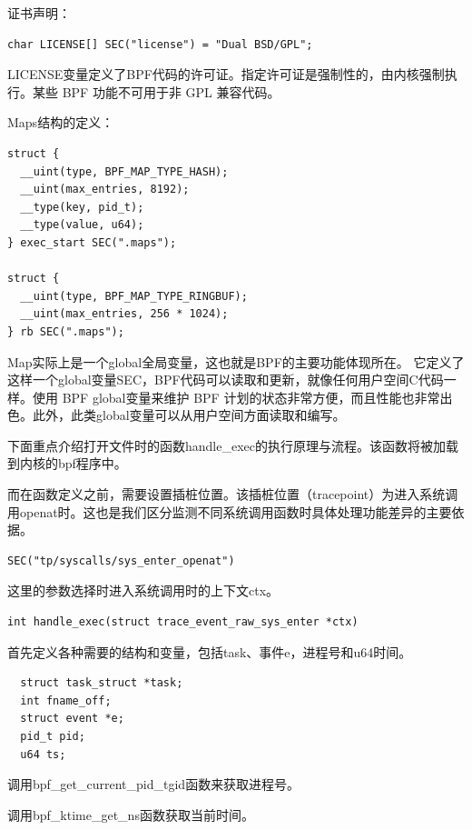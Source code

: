 \documentclass[12pt,a4paper]{ctexart}
\begin{document}
证书声明：
\begin{lstlisting}
char LICENSE[] SEC("license") = "Dual BSD/GPL";
\end{lstlisting}
LICENSE变量定义了BPF代码的许可证。指定许可证是强制性的，由内核强制执行。某些 BPF 功能不可用于非 GPL 兼容代码。


Maps结构的定义：
\begin{lstlisting}
struct {
  __uint(type, BPF_MAP_TYPE_HASH);
  __uint(max_entries, 8192);
  __type(key, pid_t);
  __type(value, u64);
} exec_start SEC(".maps");

struct {
  __uint(type, BPF_MAP_TYPE_RINGBUF);
  __uint(max_entries, 256 * 1024);
} rb SEC(".maps");
\end{lstlisting}

Map实际上是一个global全局变量，这也就是BPF的主要功能体现所在。 它定义了这样一个global变量SEC，BPF代码可以读取和更新，就像任何用户空间C代码一样。使用 BPF global变量来维护 BPF 计划的状态非常方便，而且性能也非常出色。此外，此类global变量可以从用户空间方面读取和编写。


下面重点介绍打开文件时的函数handle\_exec的执行原理与流程。该函数将被加载到内核的bpf程序中。


而在函数定义之前，需要设置插桩位置。该插桩位置（tracepoint）为进入系统调用openat时。这也是我们区分监测不同系统调用函数时具体处理功能差异的主要依据。
\begin{lstlisting}
SEC("tp/syscalls/sys_enter_openat")
\end{lstlisting}

这里的参数选择时进入系统调用时的上下文ctx。
\begin{lstlisting}
int handle_exec(struct trace_event_raw_sys_enter *ctx)
\end{lstlisting}

首先定义各种需要的结构和变量，包括task、事件e，进程号和u64时间。
\begin{lstlisting}
  struct task_struct *task;
  int fname_off;
  struct event *e;
  pid_t pid;
  u64 ts;
\end{lstlisting}
调用bpf\_get\_current\_pid\_tgid函数来获取进程号。


调用bpf\_ktime\_get\_ns函数获取当前时间。
\end{document}

